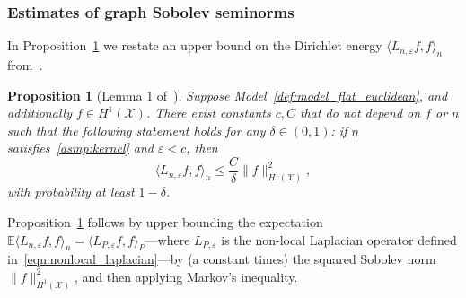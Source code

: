 \documentclass[aos]{imsart}
\theoremstyle{plain}
\newtheorem{proposition}{Proposition}
\theoremstyle{definition}
\theoremstyle{remark}
\newcommand{\Ebb}{\mathbb{E}}
\newcommand{\dotp}[2]{\langle #1, #2 \rangle}
\newcommand{\mc}[1]{\mathcal{#1}}
\newcommand{\1}{\mathbf{1}}
\begin{document}
\subsubsection{Estimates of graph Sobolev seminorms}
In Proposition~\ref{prop:graph_seminorm_fo} we restate an upper bound on the Dirichlet energy $\dotp{L_{n,\varepsilon}f}{f}_n$ from~\cite{green2021}. 
\begin{proposition}[Lemma 1 of~\cite{green2021}]
	\label{prop:graph_seminorm_fo}
	Suppose Model~\ref{def:model_flat_euclidean}, and additionally $f \in H^1(\mc{X})$. There exist constants $c,C$ that do not depend on $f$ or $n$ such that the following statement holds for any $\delta \in (0,1)$: if $\eta$ satisfies~\ref{asmp:kernel} and $\varepsilon < c$, then
	\begin{equation}
	\label{eqn:graph_seminorm_fo}
	\dotp{L_{n,\varepsilon}f}{f}_n \leq \frac{C}{\delta} \|f\|_{H^1(\mc{X})}^2,
	\end{equation}
	with probability at least $1 - \delta$.
\end{proposition}
Proposition~\ref{prop:graph_seminorm_fo} follows by upper bounding the expectation $\Ebb\dotp{L_{n,\varepsilon}f}{f}_n = \dotp{L_{P,\varepsilon}f}{f}_P$---where $L_{P,\varepsilon}$ is the non-local Laplacian operator defined in~\eqref{eqn:nonlocal_laplacian}---by (a constant times) the squared Sobolev norm $\|f\|_{H^1(\mc{X})}^2$, and then applying Markov's inequality.
\end{document}
